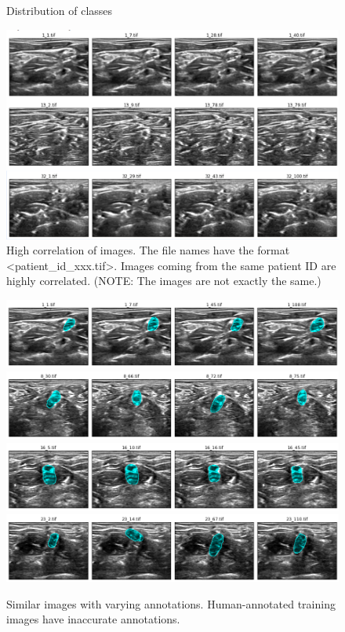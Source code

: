 \documentclass{article}
\begin{document}
\begin{figure}[h]
    \caption{Distribution of classes}
    \label{fig:distribution}
\end{figure}

\begin{figure}[h]
 \centering
  \includegraphics[width=1.0\linewidth]{figures/high_corr.png}
  \caption{
      High correlation of images. The file names have the format \textless patient\_id\_xxx.tif\textgreater . Images coming from the same patient ID are highly correlated. (NOTE: The images are not exactly the same.)
  }
  \label{fig:high_corr}
\end{figure}

\begin{figure}[h]
 \centering
  \includegraphics[width=1.0\linewidth]{figures/inaccurate_1.png}
  \includegraphics[width=1.0\linewidth]{figures/inaccurate_2.png}
  \includegraphics[width=1.0\linewidth]{figures/inaccurate_3.png}
  \includegraphics[width=1.0\linewidth]{figures/inaccurate_4.png}
  \caption{
      Similar images with varying annotations. Human-annotated training images have inaccurate annotations.
  }
  \label{fig:inaccurate}
\end{figure}
\end{document}
